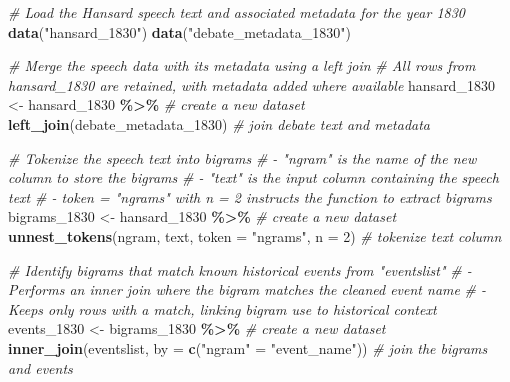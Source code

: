 \documentclass[
]{article}
\newenvironment{Shaded}{\begin{snugshade}}{\end{snugshade}}
\newcommand{\AttributeTok}[1]{\textcolor[rgb]{0.13,0.29,0.53}{#1}}
\newcommand{\CommentTok}[1]{\textcolor[rgb]{0.56,0.35,0.01}{\textit{#1}}}
\newcommand{\DecValTok}[1]{\textcolor[rgb]{0.00,0.00,0.81}{#1}}
\newcommand{\FunctionTok}[1]{\textcolor[rgb]{0.13,0.29,0.53}{\textbf{#1}}}
\newcommand{\NormalTok}[1]{#1}
\newcommand{\OtherTok}[1]{\textcolor[rgb]{0.56,0.35,0.01}{#1}}
\newcommand{\SpecialCharTok}[1]{\textcolor[rgb]{0.81,0.36,0.00}{\textbf{#1}}}
\newcommand{\StringTok}[1]{\textcolor[rgb]{0.31,0.60,0.02}{#1}}
\begin{document}
\begin{Shaded}
\begin{Highlighting}[]
\CommentTok{\# Load the Hansard speech text and associated metadata for the year 1830}
\FunctionTok{data}\NormalTok{(}\StringTok{"hansard\_1830"}\NormalTok{)}
\FunctionTok{data}\NormalTok{(}\StringTok{"debate\_metadata\_1830"}\NormalTok{)}

\CommentTok{\# Merge the speech data with its metadata using a left join}
\CommentTok{\# All rows from hansard\_1830 are retained, with metadata added where available}
\NormalTok{hansard\_1830 }\OtherTok{\textless{}{-}}\NormalTok{ hansard\_1830 }\SpecialCharTok{\%\textgreater{}\%} \CommentTok{\# create a new dataset}
  \FunctionTok{left\_join}\NormalTok{(debate\_metadata\_1830) }\CommentTok{\# join debate text and metadata}

\CommentTok{\# Tokenize the speech text into bigrams}
\CommentTok{\# {-} "ngram" is the name of the new column to store the bigrams}
\CommentTok{\# {-} "text" is the input column containing the speech text}
\CommentTok{\# {-} token = "ngrams" with n = 2 instructs the function to extract bigrams}
\NormalTok{bigrams\_1830 }\OtherTok{\textless{}{-}}\NormalTok{ hansard\_1830 }\SpecialCharTok{\%\textgreater{}\%} \CommentTok{\# create a new dataset}
  \FunctionTok{unnest\_tokens}\NormalTok{(ngram, text, }\AttributeTok{token =} \StringTok{"ngrams"}\NormalTok{, }\AttributeTok{n =} \DecValTok{2}\NormalTok{) }\CommentTok{\# tokenize text column}

\CommentTok{\# Identify bigrams that match known historical events from "eventslist"}
\CommentTok{\# {-} Performs an inner join where the bigram matches the cleaned event name}
\CommentTok{\# {-} Keeps only rows with a match, linking bigram use to historical context}
\NormalTok{events\_1830 }\OtherTok{\textless{}{-}}\NormalTok{ bigrams\_1830 }\SpecialCharTok{\%\textgreater{}\%} \CommentTok{\# create a new dataset}
  \FunctionTok{inner\_join}\NormalTok{(eventslist, }\AttributeTok{by =} \FunctionTok{c}\NormalTok{(}\StringTok{"ngram"} \OtherTok{=} \StringTok{"event\_name"}\NormalTok{)) }\CommentTok{\# join the bigrams and events}


\end{Highlighting}
\end{Shaded}
\end{document}
